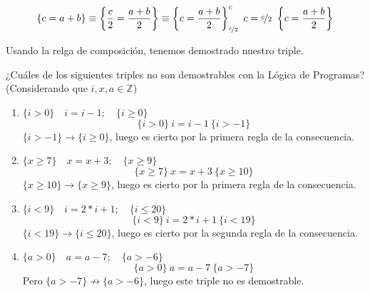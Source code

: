 \begin{ejercicio}
\begin{enumerate}
\begin{enumerate}
                    \begin{equation*}
                        \{c=a+b\}\equiv \left\{\frac{c}{2} = \frac{a+b}{2}\right\} \equiv \left\{c=\frac{a+b}{2}\right\}^c_{\nicefrac{c}{2}}\ c=\nicefrac{c}{2}\ \left\{c=\frac{a+b}{2}\right\}
                    \end{equation*}
            \end{enumerate}
            Usando la relga de composición, tenemos demostrado nuestro triple.
    \end{enumerate}
\end{ejercicio}

\begin{ejercicio}
    ¿Cuáles de los siguientes triples no son demostrables con la Lógica de Programas?
    (Considerando que $i,x,a \in \mathbb{Z}$)
    \begin{enumerate}
        \item $\{i > 0\} \quad i = i - 1; \quad \{i \geq 0\}$\\
            \begin{equation*}
                \{i>0\}\ i=i-1\ \{i>-1\} 
            \end{equation*}
            $\{i>-1\}\rightarrow \{i\geq 0\}$, luego es cierto por la primera regla de la consecuencia.
        \item $\{x \geq 7\} \quad x = x + 3; \quad \{x \geq 9\}$\\
            \begin{equation*}
                \{x\geq 7\}\ x=x+3\ \{x\geq 10\}
            \end{equation*}
            $\{x\geq 10\}\rightarrow\{x\geq 9\}$, luego es cierto por la primera regla de la consecuencia.
        \item $\{i < 9\} \quad i = 2 \ast i + 1; \quad \{ i \leq 20\}$\\
            \begin{equation*}
                \{i<9\}\ i=2\ast i+1\ \{i<19\}
            \end{equation*}
            $\{i<19\}\rightarrow\{i\leq 20\}$, luego es cierto por la segunda regla de la consecuencia.
        \item $\{a > 0\} \quad a = a - 7; \quad \{a > -6\}$\\
            \begin{equation*}
                \{a>0\}\ a=a-7\ \{a>-7\}
            \end{equation*}
            Pero $\{a>-7\}\not\rightarrow\{a>-6\}$, luego este triple no es demostrable.
    \end{enumerate}
\end{ejercicio}

